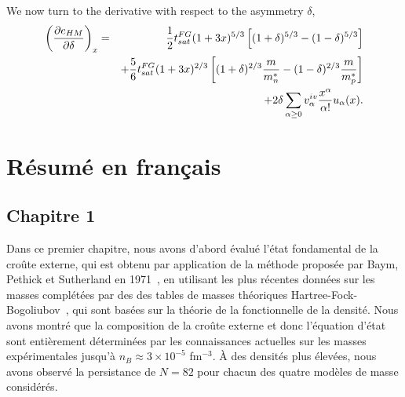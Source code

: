 %
We now turn to the derivative with respect to the asymmetry $\delta$,
%
\begin{eqnarray}
  \left(\frac{\partial e_{HM}}{\partial \delta}\right)_x &=&
  \frac{1}{2}t_{sat}^{FG}(1+3x)^{5/3}\left[(1+\delta)^{5/3} 
  - (1-\delta)^{5/3}\right]\notag\\
                                                         &&+ 
  \frac{5}{6}t_{sat}^{FG}(1+3x)^{2/3}\left[(1+\delta)^{2/3}\frac{m}{m_n^*} -
  (1-\delta)^{2/3}\frac{m}{m_p^*}\right]\notag\\
                                                         &&+
  2\delta \sum_{\alpha \geq 0}v_\alpha^{iv}\frac{x^\alpha}{\alpha!}u_\alpha(x).
\end{eqnarray}
%

\chapter{Résumé en français}\label{appendix:fr_part}

\section{Chapitre 1}

Dans ce premier chapitre, nous avons d'abord évalué l'état fondamental de la 
croûte externe, qui est obtenu par application de la méthode proposée par Baym,
Pethick et Sutherland en 1971~\cite{BPS}, en utilisant les plus récentes
données sur les masses \cite{Huang2017,Welker2017} complétées par des 
des tables de masses théoriques Hartree-Fock-Bogoliubov~\cite{Samyn2002},
qui sont basées sur la théorie de la fonctionnelle de la densité. 
Nous avons montré que la composition de la croûte externe et donc l'équation
d'état sont entièrement déterminées par les connaissances actuelles sur les 
masses expérimentales jusqu'à $n_B \approx 3\times 10^{-5}$ fm$^{-3}$.
À des densités plus élevées, nous avons observé la persistance de $N=82$ pour 
chacun des quatre modèles de masse considérés.

